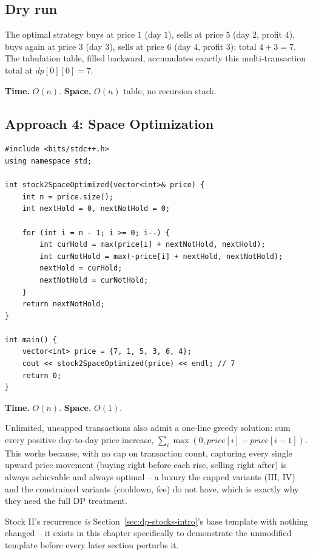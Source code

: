 \subsection*{Dry run}


The optimal strategy buys at price $1$ (day $1$), sells at price $5$
(day $2$, profit $4$), buys again at price $3$ (day $3$), sells at
price $6$ (day $4$, profit $3$): total $4+3=7$. The tabulation table,
filled backward, accumulates exactly this multi-transaction total at
$\textit{dp}[0][0]=7$.

\begin{complexitybox}
\textbf{Time.} $O(n)$.
\textbf{Space.} $O(n)$ table, no recursion stack.
\end{complexitybox}

\subsection*{Approach 4: Space Optimization}

\begin{lstlisting}
#include <bits/stdc++.h>
using namespace std;

int stock2SpaceOptimized(vector<int>& price) {
    int n = price.size();
    int nextHold = 0, nextNotHold = 0;

    for (int i = n - 1; i >= 0; i--) {
        int curHold = max(price[i] + nextNotHold, nextHold);
        int curNotHold = max(-price[i] + nextHold, nextNotHold);
        nextHold = curHold;
        nextNotHold = curNotHold;
    }
    return nextNotHold;
}

int main() {
    vector<int> price = {7, 1, 5, 3, 6, 4};
    cout << stock2SpaceOptimized(price) << endl; // 7
    return 0;
}
\end{lstlisting}

\begin{complexitybox}
\textbf{Time.} $O(n)$.
\textbf{Space.} $O(1)$.
\end{complexitybox}

\begin{ideabox}
Unlimited, uncapped transactions also admit a one-line greedy solution:
sum every positive day-to-day price increase,
$\sum_i \max(0, \textit{price}[i]-\textit{price}[i-1])$. This works
because, with no cap on transaction count, capturing every single
upward price movement (buying right before each rise, selling right
after) is always achievable and always optimal -- a luxury the capped
variants (III, IV) and the constrained variants (cooldown, fee) do not
have, which is exactly why they need the full DP treatment.
\end{ideabox}

\begin{takeawaybox}
Stock II's recurrence \emph{is} Section~\ref{sec:dp-stocks-intro}'s base
template with nothing changed -- it exists in this chapter specifically
to demonstrate the unmodified template before every later section
perturbs it.
\end{takeawaybox}

